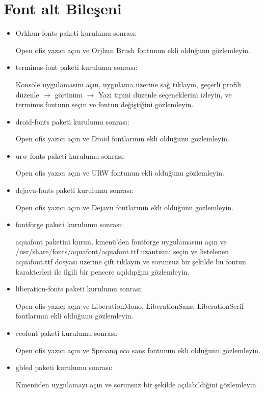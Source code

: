 \documentclass[a4paper,10pt]{article}
\begin{document}
\section{Font alt Bileşeni}
\begin{itemize}
\item Orkhun-fonts paketi kurulumu sonrası:

Open ofis yazıcı açın ve Orjhun Brush fontunun ekli olduğunu gözlemleyin.

\item  terminus-font paketi kurulumu sonrası:

Konsole uygulamasını açın, uygulama üzerine sağ tıklayın, geçerli profili düzenle $\rightarrow$ görünüm $\rightarrow$ Yazı tipini düzenle seçeneklerini izleyin, ve terminus fontunu seçin ve fontun değiştiğini gözlemleyin.

\item  droid-fonts paketi kurulumu sonrası:

Open ofis yazıcı açın ve Droid fontlarının ekli olduğunu gözlemleyin.


\item  urw-fonts paketi kurulumu sonrası:

Open ofis yazıcı açın ve URW fontunun ekli olduğunu gözlemleyin.


\item  dejavu-fonts paketi kurulumu sonrası:

Open ofis yazıcı açın ve Dejavu fontlarının ekli olduğunu gözlemleyin.
 \item fontforge paketi kurulumu sonrası:

aquafont paketini kurun, kmenü'den fontforge uygulamasını açın ve /usr/share/fonts/aquafont/aquafont.ttf uzantısını seçin ve listelenen aquafont.ttf  dosyası üzerine çift tıklayın ve sorunsuz bir şekilde bu fontun karakterleri ile ilgili bir pencere açıldıpğını gözlemleyin.
\item liberation-fonts paketi kurulumu sonrası:

Open ofis yazıcı açın ve LiberationMono, LiberationSans, LiberationSerif fontlarının ekli olduğunu gözlemleyin.

\item ecofont paketi kurulumu sonrası:

Open ofis yazıcı açın ve Sproanq eco sans fontunun ekli olduğunu gözlemleyin.
\item gbfed paketi kurulumu sonrası:

Kmenüden uygulamayı açın ve sorunsuz bir şekilde açılabildiğini gözlemleyin.
\end{itemize}
\end{document}
